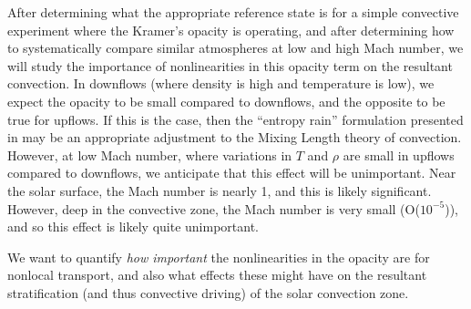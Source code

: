 \documentclass[aasms,12pt]{article}
\begin{document}
After determining what the appropriate reference state is for a simple convective experiment
where the Kramer's opacity is operating, and after determining how to systematically compare
similar atmospheres at low and high Mach number, we will study the importance of nonlinearities
in this opacity term on the resultant convection.  In downflows (where density is high
and temperature is low), we expect the opacity to be small compared to downflows, and
the opposite to be true for upflows.  If this is the case, then the ``entropy rain'' formulation
presented in \cite{brandenburg2016} may be an appropriate adjustment to the Mixing Length
theory of convection.  However, at low Mach number, where variations in $T$ and $\rho$ are small
in upflows compared to downflows, we anticipate that this effect will be unimportant.  Near the
solar surface, the Mach number is nearly 1, and this is likely significant.  However, deep in
the convective zone, the Mach number is very small (O($10^{-5}$)), and so this effect is
likely quite unimportant.

We want to quantify \emph{how important} the nonlinearities in the opacity are for 
nonlocal transport, and also what effects these might have on the resultant stratification
(and thus convective driving) of the solar convection zone.
\end{document}
